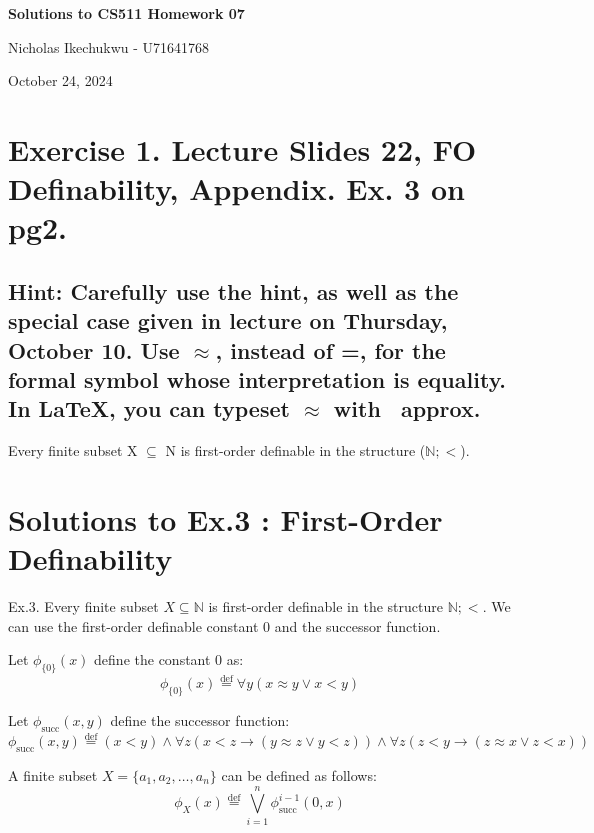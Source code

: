 \documentclass{article}
\newcommand{\defeq}{\stackrel{\text{def}}{=}}
\begin{document}
\begin{center}
    \Large\textbf{Solutions to CS511 Homework 07}
    
    \vspace{0.5cm}
    
    \large Nicholas Ikechukwu - U71641768
    
    \vspace{0.3cm}
    
    \large October 24, 2024
\end{center}



\section*{Exercise 1. Lecture Slides 22, FO Definability, Appendix. Ex. 3 on pg2. }

\subsection*{Hint: Carefully use the hint, as well as the special case given in lecture on Thursday, October 10.
Use $\approx$, instead of =, for the formal symbol whose interpretation is equality. In LaTeX, you can typeset
$\approx$ with \ approx.}

\begin{mdframed}
    Every finite subset X $\subseteq$ N is first-order definable in the structure ($\mathbb{N}; <$).
\end{mdframed}

\section*{Solutions to Ex.3 : First-Order Definability}
Ex.3. Every finite subset $X \subseteq \mathbb{N}$ is first-order definable in the structure $\mathbb{N}; <$. We can use the first-order definable constant 0 and the successor function.

Let $\phi_{\{0\}}(x)$ define the constant 0 as:
$$
\phi_{\{0\}}(x) \defeq \forall y (x \approx y \lor x < y)
$$


Let $\phi_{\text{succ}}(x, y)$ define the successor function:
$$
\phi_{\text{succ}}(x, y) \defeq (x < y) \land \forall z (x < z \rightarrow (y \approx z \lor y < z)) \land \forall z (z < y \rightarrow (z \approx x \lor z < x))
$$


A finite subset $X = \{ a_1, a_2, \ldots, a_n \}$ can be defined as follows:
$$
\phi_X(x) \defeq \bigvee_{i=1}^{n} \phi_{\text{succ}}^{i-1}(0, x)
$$
\end{document}
